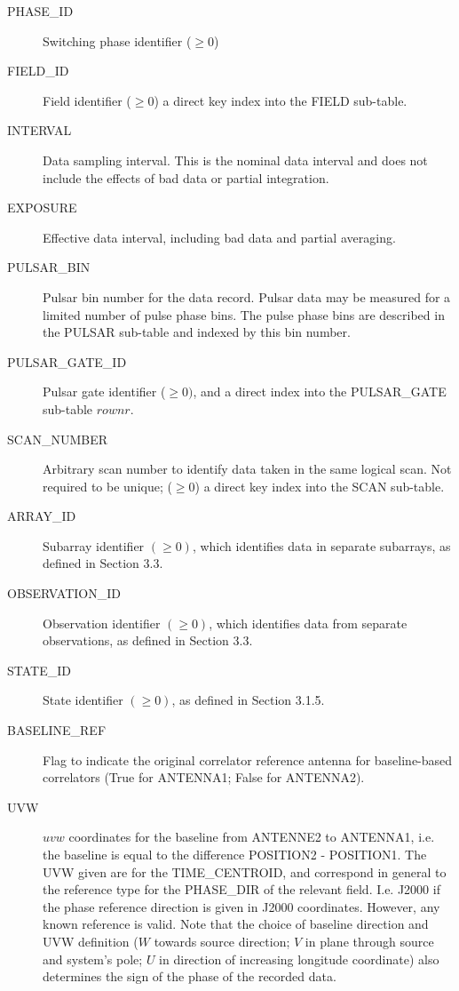 \documentclass{article}
\begin{document}
\begin{description}
\item[PHASE\_ID] Switching phase identifier ($\geq 0$) 

\item[FIELD\_ID] Field identifier ($\geq 0$) a direct key index into the FIELD sub-table.

\item[INTERVAL] Data sampling interval. This is the nominal data
interval and does not include the effects of bad data or partial
integration.

\item[EXPOSURE] Effective data interval, including bad data and
partial averaging.

\item[PULSAR\_BIN] Pulsar bin number for the data record. Pulsar data
may be measured for a limited number of pulse phase bins. The pulse
phase bins are described in the PULSAR sub-table and indexed by this
bin number.

\item[PULSAR\_GATE\_ID] Pulsar gate identifier ($\geq 0)$, and a direct
index into the PULSAR\_GATE sub-table $rownr$. 

\item[SCAN\_NUMBER] Arbitrary scan number to identify data taken in
  the same logical scan. Not required to be unique; ($\geq 0$) a
  direct key index into the SCAN sub-table.

\item[ARRAY\_ID] Subarray identifier $(\geq 0)$, which identifies data
in separate subarrays, as defined in Section 3.3.

\item[OBSERVATION\_ID] Observation identifier $(\geq 0)$, which identifies
data from separate observations, as defined in Section 3.3.

\item[STATE\_ID] State identifier $(\geq 0)$, as defined in Section 3.1.5.

\item[BASELINE\_REF] Flag to indicate the original correlator
reference antenna for baseline-based correlators (True for ANTENNA1;
False for ANTENNA2).

\item[UVW] $uvw$ coordinates for the baseline from ANTENNE2 to ANTENNA1,
   i.e. the
   baseline is equal to the difference POSITION2 - POSITION1. The UVW given
   are for the TIME\_CENTROID, and correspond in general to the reference type
   for the PHASE\_DIR of the relevant field. I.e. J2000 if the phase reference
   direction is given in J2000 coordinates. However, any known reference is
   valid.
   Note that the choice of baseline direction and UVW definition ($W$ towards
   source direction; $V$ in plane through source and system's pole; $U$ in
   direction of increasing longitude coordinate) also determines the sign of
   the phase of the recorded data.


\end{description}
\end{document}
